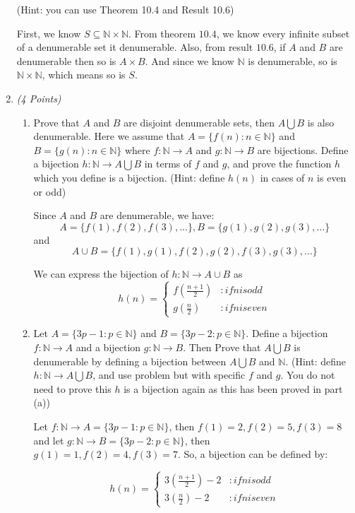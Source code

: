 \documentclass[10pt]{article} %
\newcommand{\N}{\mathbb{N}}
\newcommand{\points}[1]{{\it (#1 Points)}}
\begin{document}
\begin{enumerate}
(Hint: you can use Theorem 10.4 and Result 10.6)

 First, we know $S \subseteq \N \times \N$.  From theorem $10.4$, we know every infinite subset of a denumerable set it denumerable.  Also, from result $10.6$, if $A$ and $B$ are denumerable then so is $A\times B$.  And since we know $\N$ is denumerable, so is $\N \times \N$, which means so is $S$.  

\item\points{4}
\begin{enumerate}
  \item Prove that $A$ and $B$ are disjoint denumerable sets, then $A\bigcup B$ is also denumerable. Here we assume that $A=\{f(n):n\in \N\}$ and $B=\{g(n):n\in \N\}$ where $f:\N\to A$ and $g: \N\to B$ are bijections. Define a bijection $h:\N\to
A\bigcup B$ in terms of $f$ and $g$, and prove the function $h$ which you define is a bijection. (Hint: define $h(n)$ in cases of $n$ is even or odd)

 Since $A$ and $B$ are denumerable, we have:
$$A=\{f(1),f(2),f(3),...\}, B=\{g(1),g(2),g(3),...\}$$ and $$A\cup B=\{f(1),g(1),f(2),g(2),f(3),g(3),...\}$$

We can express the bijection of $h: \N \rightarrow A\cup B$ as 
\[h(n) = \left\{
  \begin{array}{lr}
    f(\frac{n+1}{2}) & : if n is odd\\
    g(\frac{n}{2}) & : if n is even
    
  \end{array}
\right.
\]

\item Let $A=\{3p-1:p\in \N\}$ and $B=\{3p-2:p\in \N\}$. Define a bijection $f:\N\to A$ and a bijection  $g:\N\to B$. Then  Prove that $A \bigcup B$ is denumerable by defining a bijection between  $A \bigcup B$ and $\N$. (Hint: define $h: \N\to A \bigcup B$, and use problem but with specific $f$ and $g$. You do not need to prove this $h$ is a bijection again as this has been proved in part (a))

 Let $f:\N \rightarrow A = \{3p-1:p\in \N\}$, then $f(1)=2,f(2)=5,f(3)=8$ and let $g:\N \rightarrow B = \{3p-2:p\in \N\}$, then $g(1)=1,f(2)=4,f(3)=7$.  So, a bijection can be defined by:

\[h(n) = \left\{
  \begin{array}{lr}
    3(\frac{n+1}{2})-2 & : if n is odd\\
    3(\frac{n}{2})-2 & : if n is even
    

\end{array}\]
\end{enumerate}
\end{enumerate}
\end{document}
